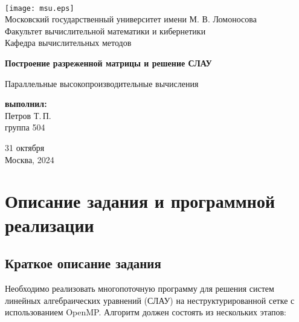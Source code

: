 \documentclass[12pt, a4paper]{article}
\begin{document}
	
\thispagestyle{empty}

\begin{center}
	\ \vspace{-3cm}
	
	\texttt{[image: msu.eps]}\\
	{Московский государственный университет имени М. В. Ломоносова}\\
	Факультет вычислительной математики и кибернетики\\
	Кафедра вычислительных методов
	
	\vspace{6cm}
	
	{\Large \bfseries Построение разреженной матрицы и решение СЛАУ}
	
	\vspace{1cm}
	
	{\large Параллельные высокопроизводительные вычисления}
\end{center}

\vfill

\begin{flushright}
	\textbf{выполнил:}\\
	Петров Т.\,П. \\
	группа 504
\end{flushright}

\vfill

\begin{center}
	31 октября \\
	Москва, 2024
\end{center}

\enlargethispage{2\baselineskip}

\newpage

\tableofcontents

\newpage

\section{Описание задания и программной реализации}

\subsection{Краткое описание задания}

Необходимо реализовать многопоточную программу для решения систем линейных алгебраических уравнений (СЛАУ) на неструктурированной сетке с использованием OpenMP. Алгоритм должен состоять из нескольких этапов:
\end{document}
